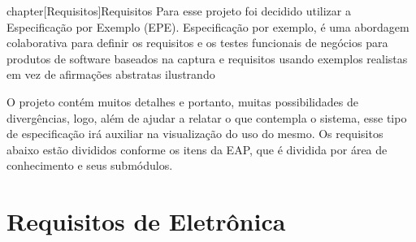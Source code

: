 chapter[Requisitos]{Requisitos}
	Para esse projeto foi decidido utilizar a Especificação por Exemplo (EPE). Especificação por exemplo, é uma 
	abordagem colaborativa para definir os requisitos e os testes funcionais de negócios para produtos de software 
	baseados na captura e requisitos usando exemplos realistas em vez de afirmações abstratas ilustrando \cite{bdd} 

	O projeto contém muitos detalhes e portanto, muitas possibilidades de divergências, logo, além de ajudar a relatar 
	o que contempla o sistema, esse tipo de especificação irá auxiliar na visualização do uso do mesmo. Os requisitos 
	abaixo estão divididos conforme os itens da EAP, que é dividida por área de conhecimento e seus submódulos.

	\section[Requisitos de Eletrônica]{Requisitos de Eletrônica}

